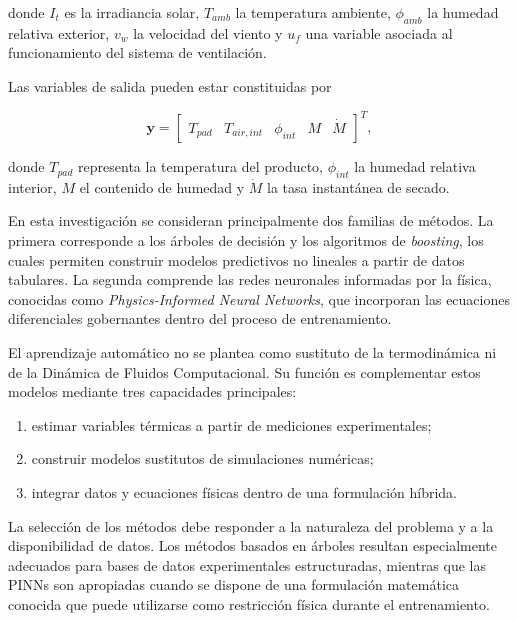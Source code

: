 donde $I_t$ es la irradiancia solar, $T_{amb}$ la temperatura ambiente, $\phi_{amb}$ la humedad relativa exterior, $v_w$ la velocidad del viento y $u_f$ una variable asociada al funcionamiento del sistema de ventilación.

Las variables de salida pueden estar constituidas por

\begin{equation}
\mathbf{y}
=
\begin{bmatrix}
T_{pad} &
T_{air,int} &
\phi_{int} &
M &
\dot{M}
\end{bmatrix}^{T},
\end{equation}

donde $T_{pad}$ representa la temperatura del producto, $\phi_{int}$ la humedad relativa interior, $M$ el contenido de humedad y $\dot{M}$ la tasa instantánea de secado.

En esta investigación se consideran principalmente dos familias de métodos. La primera corresponde a los árboles de decisión y los algoritmos de \textit{boosting}, los cuales permiten construir modelos predictivos no lineales a partir de datos tabulares. La segunda comprende las redes neuronales informadas por la física, conocidas como \textit{Physics-Informed Neural Networks}, que incorporan las ecuaciones diferenciales gobernantes dentro del proceso de entrenamiento.

\begin{tcolorbox}[
title=Enfoque adoptado,
colback=blue!4,
colframe=blue!65!black
]
El aprendizaje automático no se plantea como sustituto de la termodinámica ni de la Dinámica de Fluidos Computacional. Su función es complementar estos modelos mediante tres capacidades principales:

\begin{enumerate}
    \item estimar variables térmicas a partir de mediciones experimentales;
    \item construir modelos sustitutos de simulaciones numéricas;
    \item integrar datos y ecuaciones físicas dentro de una formulación híbrida.
\end{enumerate}
\end{tcolorbox}

La selección de los métodos debe responder a la naturaleza del problema y a la disponibilidad de datos. Los métodos basados en árboles resultan especialmente adecuados para bases de datos experimentales estructuradas, mientras que las PINNs son apropiadas cuando se dispone de una formulación matemática conocida que puede utilizarse como restricción física durante el entrenamiento.



